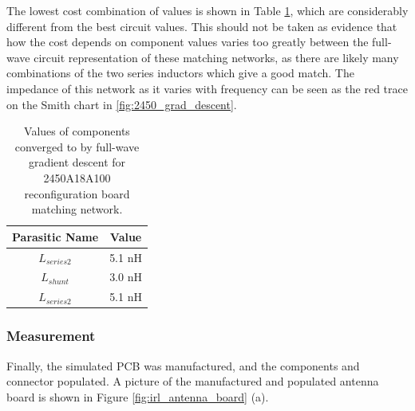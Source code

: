 \documentclass[12pt]{usfcoe}
\begin{document}
    The lowest cost combination of values is shown in Table \ref{tbl:2450_3D_vals}, which are considerably different from the best circuit values.
    This should not be taken as evidence that how the cost depends on component values varies too greatly between the full-wave circuit representation of these matching networks, as there are likely many combinations of the two series inductors which give a good match.
    The impedance of this network as it varies with frequency can be seen as the red trace on the Smith chart in \ref{fig:2450_grad_descent}.
	
	\begin{table}[H]
	\centering
	\begin{tabular}{|c|c|}
		\hline  
		 Parasitic Name & Value \\
		 \hline
		 $L_{series2}$ & 5.1 nH \\ %
		 \hline
		 $L_{shunt}$ & 3.0 nH \\
		 \hline
		 $L_{series2}$ & 5.1 nH \\
		 \hline
	\end{tabular}
	\caption{Values of components converged to by full-wave gradient descent for 2450A18A100 reconfiguration board matching network.}
	\label{tbl:2450_3D_vals}
	\end{table}
	
    \subsubsection{Measurement}
    
    \indent Finally, the simulated PCB was manufactured, and the components and connector populated.
    A picture of the manufactured and populated antenna board is shown in Figure \ref{fig:irl_antenna_board} (a).
    
\end{document}
